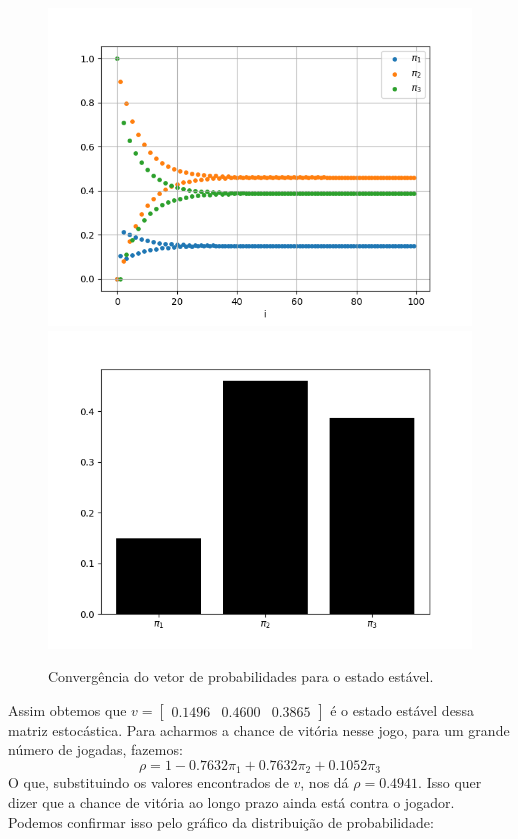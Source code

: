 \documentclass[12pt]{article}
\begin{document}
\begin{figure}[H]
\centering
\includegraphics[scale=0.55]{graph6.png}
\includegraphics[scale=0.55]{graph7.png}
\caption{Convergência do vetor de probabilidades para o estado estável.}
\end{figure}

Assim obtemos que $v = \begin{bmatrix} 0.1496 & 0.4600 & 0.3865 \end{bmatrix}$ é o estado estável dessa matriz estocástica. Para acharmos a chance de vitória nesse jogo, para um grande número de jogadas, fazemos:\\

$$
\rho = 1 - 0.7632\pi_1 + 0.7632\pi_2 + 0.1052\pi_3 
$$
O que, substituindo os valores encontrados de $v$, nos dá $\rho = 0.4941$. Isso quer dizer que a chance de vitória ao longo prazo ainda está contra o jogador.\\
Podemos confirmar isso pelo gráfico da distribuição de probabilidade:
\end{document}
